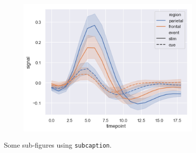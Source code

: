 \begin{figure}[t]
\begin{subfigure}[b]{0.32\linewidth}
    \includegraphics[width=\textwidth]{images/errorband_lineplots.png}
    \label{fig:subcaption-subfigure3}
\end{subfigure}
\caption{Some sub-figures using \texttt{subcaption}.}
\label{fig:subcaption-subfigures}
\end{figure}
